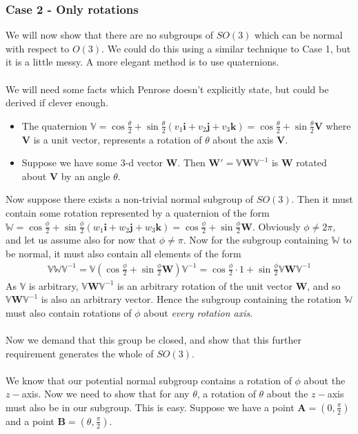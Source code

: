 \subsubsection*{Case 2 - Only rotations}
We will now show that there are no subgroups of $SO(3)$ which can be normal with respect to $O(3)$. We could do this using a similar technique to Case 1, but it is a little messy. A more elegant method is to use quaternions. \\ \\ We will need some facts which Penrose doesn't explicitly state, but could be derived if clever enough.
\begin{itemize}
\item The quaternion $\mathbb{V}=\cos \frac{\theta}{2}+\sin \frac{\theta}{2}(v_1\textbf{i}+v_{2}\textbf{j}+v_{3}\textbf{k})=\cos \frac{\theta}{2}+\sin \frac{\theta}{2}\mathbf{V}$ where $\mathbf{V}$ is a unit vector, represents a rotation of $\theta$ about the axis $\mathbf{V}$.
\item Suppose we have some 3-d vector $\mathbf{W}$. Then $\mathbf{W}'=\mathbb{V}\mathbf{W}\mathbb{V}^{-1}$ is $\mathbf{W}$ rotated about $\mathbf{V}$ by an angle $\theta$.
\end{itemize}
Now suppose there exists a non-trivial normal subgroup of $SO(3)$. Then it must contain some rotation represented by a quaternion of the form $\mathbb{W}=\cos \frac{\phi}{2}+\sin \frac{\phi}{2}(w_1\textbf{i}+w_{2}\textbf{j}+w_{3}\textbf{k})=\cos \frac{\phi}{2}+\sin \frac{\phi}{2}\mathbf{W}$. Obviously $\phi\neq 2\pi$, and let us assume also for now that $\phi\neq \pi$. Now for the subgroup containing $\mathbb{W}$ to be normal, it must also contain all elements of the form \begin{align*}
\mathbb{V}\mathbb{W}\mathbb{V}^{-1}=\mathbb{V}(\cos \frac{\phi}{2}+\sin \frac{\phi}{2}\mathbf{W})\mathbb{V}^{-1}=\cos \frac{\phi}{2}\cdot 1+\sin \frac{\phi}{2}\mathbb{V}\mathbf{W}\mathbb{V}^{-1}
\end{align*}
As $\mathbb{V}$ is arbitrary, $\mathbb{V}\mathbf{W}\mathbb{V}^{-1}$ is an arbitrary rotation of the unit vector $\mathbf{W}$, and so $\mathbb{V}\mathbf{W}\mathbb{V}^{-1}$ is also an arbitrary vector. Hence the subgroup containing the rotation $\mathbb{W}$ must also contain rotations of $\phi$ about \emph{every rotation axis}. \\ \\ Now we demand that this group be closed, and show that this further requirement generates the whole of $SO(3)$.  \\ \\ We know that our potential normal subgroup contains a rotation of $\phi$ about the $z-$axis. Now we need to show that for any $\theta$, a rotation of $\theta$ about the $z-$axis must also be in our subgroup. This is easy. Suppose we have a point $\mathbf{A}=(0,\frac{\pi}{2})$ and a point $\mathbf{B}=(\theta,\frac{\pi}{2})$.  


